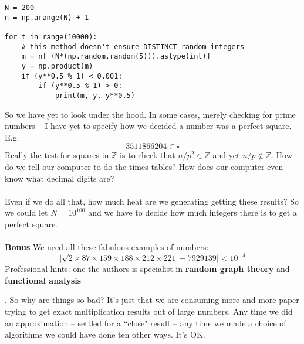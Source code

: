 \documentclass[12pt]{article}
\begin{document}
{\begin{verbatim}
N = 200
n = np.arange(N) + 1

for t in range(10000):
    # this method doesn't ensure DISTINCT random integers
    m = n[ (N*(np.random.random(5))).astype(int)]
    y = np.product(m)
    if (y**0.5 % 1) < 0.001:
        if (y**0.5 % 1) > 0:
            print(m, y, y**0.5)
\end{verbatim}
So we have yet to look under the hood.  In some cases, merely checking for prime numbers -- I have yet to specify how we decided a number was a perfect square.  E.g. 
$$ 3511866204 \in \square $$
Really the test for squares in $\mathbb{Z}$ is to check that $n/p^2 \in \mathbb{Z}$ and yet $n/p \notin \mathbb{Z}$.  How do we tell our computer to do the times tables? How does our computer even know what decimal digits are? \\ \\ Even if we do all that, how much heat are we generating getting these results?  So we could let $N = 10^{100}$ and we have to decide how much integers there is to get a perfect square. \\ \\
\textbf{Bonus} We need all these fabulous examples of numbers:
$$ \big| \sqrt{2 \times 87 \times 159 \times 188 \times 212 \times 221} - 7929139 \big| < 10^{-4} $$
Professional hints: one the authors is specialist in {\color{ blue}\textbf{random graph theory}} and {\color{blue}\textbf{functional analysis}}}.  So why are things so bad?  It's just that we are consuming more and more paper trying to get exact multiplication results out of large numbers.  Any time we did an approximation -- settled for a ``close" result -- any time we made a choice of algorithms we could have done ten other ways.  It's OK.

\newpage
\end{document}
